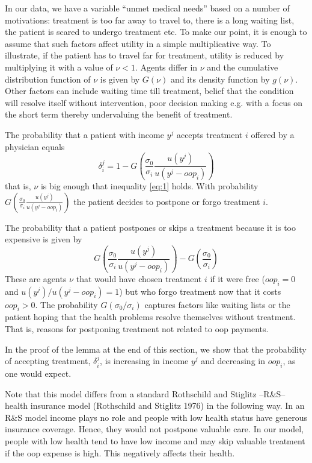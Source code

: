 \documentclass[a4paper,12pt]{article}
\makeatletter
\newcommand{\citeprocitem}[2]{\hyper@linkstart{cite}{citeproc_bib_item_#1}#2\hyper@linkend}
\makeatother
\begin{document}
In our data, we have a variable ``unmet medical needs'' based on a number of motivations: treatment is too far away to travel to, there is a long waiting list, the patient is scared to undergo treatment etc. To make our point, it is enough to assume that such factors affect utility in a simple multiplicative way. To illustrate, if the patient has to travel far for treatment, utility is reduced by multiplying it with a value of \(\nu < 1\). Agents differ in \(\nu\) and the cumulative distribution function of \(\nu\) is given by \(G(\nu)\) and its density function by \(g(\nu)\). Other factors can include waiting time till treatment, belief that the condition will resolve itself without intervention, poor decision making e.g. with a focus on the short term thereby undervaluing the benefit of treatment.

The probability that a patient with income \(y^{j}\) accepts treatment \(i\) offered by a physician equals
\begin{equation}
\label{eq:2}
\delta_i^j = 1-G\left( \frac{\sigma_0}{\sigma_i} \frac{u(y^{j})}{u(y^{j}-oop_i)} \right)
\end{equation}
that is, \(\nu\) is big enough that inequality \eqref{eq:1} holds. With probability \(G\left( \frac{\sigma_0}{\sigma_i} \frac{u(y^{j})}{u(y^{j}-oop_i)} \right)\) the patient decides to postpone or forgo treatment \(i\).

The probability that a patient postpones or skips a treatment because it is too expensive is given by
\begin{equation}
\label{eq:3}
G\left( \frac{\sigma_0}{\sigma_i} \frac{u(y^{j})}{u(y^{j}-oop_{i})} \right) - G\left( \frac{\sigma_0}{\sigma_i} \right)
\end{equation}
These are agents \(\nu\) that would have chosen treatment \(i\) if it were free (\(oop_{i}=0\) and \(u(y^j)/u(y^j-oop_i)=1\)) but who forgo treatment now that it costs \(oop_{i}>0\). The probability \(G(\sigma_{0}/\sigma_{i})\) captures factors like waiting lists or the patient hoping that the health problems resolve themselves without treatment. That is, reasons for postponing treatment not related to oop payments.

In the proof of the lemma at the end of this section, we show that the probability of accepting treatment, \(\delta_i^j\), is increasing in income \(y^j\) and decreasing in \(oop_{i}\), as one would expect.

Note that this model differs from a standard Rothschild and Stiglitz --R\&S-- health insurance model (\citeprocitem{22}{Rothschild and Stiglitz 1976}) in the following way. In an R\&S model income plays no role and people with low health status have generous insurance coverage. Hence, they would not postpone valuable care. In our model, people with low health tend to have low income and may skip valuable treatment if the oop expense is high. This negatively affects their health.
\end{document}
